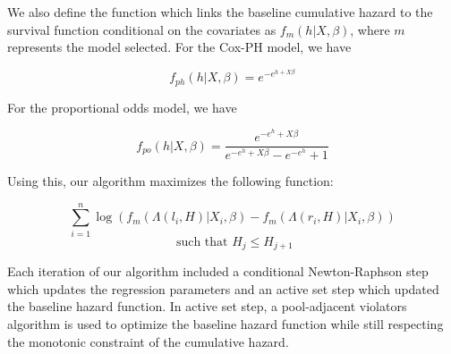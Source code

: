 \documentclass[article]{jss}
\begin{document}
	We also define the function which links the baseline cumulative hazard to the survival function conditional on the covariates as $f_m(h | X, \beta)$, where $m$ represents the model selected. For the Cox-PH model, we have
	
	\[
	f_{ph}(h |X, \beta) = e^{-e^{h + X \beta } }
	\]
	
	For the proportional odds model, we have 
	
	\[
	f_{po}(h | X, \beta) = \frac{ e^{ -e^h + X \beta} } { e^{ -e^h + X \beta}  - e^{-e^h} + 1  }
	\]
	
	Using this, our algorithm maximizes the following function:
	
	\[
	\displaystyle \sum_{i = 1}^n \log \left(  f_m( \Lambda(l_i, H) | X_i, \beta)  - f_m( \Lambda(r_i, H) | X_i, \beta)		\right)
	\]
	\[
	\text{ such that } H_j \leq H_{j+1}
	\]
	
	Each iteration of our algorithm included a conditional Newton-Raphson step which updates the regression parameters and an active set step which updated the baseline hazard function. In active set step, a pool-adjacent violators algorithm is used to optimize the baseline hazard function while still respecting the monotonic constraint of the cumulative hazard. 
	
\end{document}
